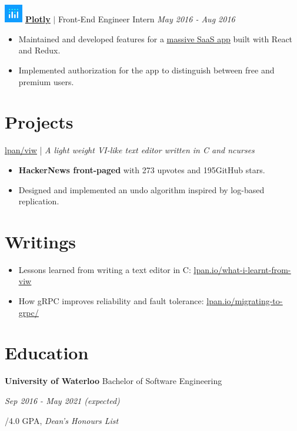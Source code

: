 \documentclass[paper=a4,fontsize=15pt]{scrartcl}
\newcommand{\quarterspace}{\vspace*{0.25em}}
\newcommand{\fullspace}{\vspace*{1em}}
\newcommand{\http}[1]{\href{http://#1}{\ul{#1}}}
\begin{document}
\fullspace
\noindent \includegraphics[width=0.8cm, height=0.8cm]{assets/plotly.png}
\normalsize
\noindent \href{https://plot.ly}{\textbf{\ul{Plotly}}}
$\vert$ \small Front-End Engineer Intern
{\hfill \footnotesize \textit{May 2016 - Aug 2016}}
\begin{itemize}[noitemsep,leftmargin=20pt,label=\raisebox{0.25ex}{\tiny$\bullet$},topsep=5pt]
  \small
  \item Maintained and developed features for a
    \href{https://plot.ly/online-chart-maker/}{\ul{massive SaaS app}} built with
    React and Redux.
  \item Implemented authorization for the app to distinguish between free and
    premium users.
\end{itemize}

\section*{Projects}{}
{
  \noindent \large
  \href{https://github.com/lpan/viw}{\ul{lpan/viw}} | \normalsize \textit{\small
    A light weight VI-like text editor written in C and ncurses}
}
\begin{itemize}[noitemsep,leftmargin=20pt,label=\raisebox{0.25ex}{\tiny$\bullet$},topsep=5pt]
  \small
  \item \textbf{HackerNews front-paged}​ with 273​ upvotes and 195​ GitHub stars.
  \item Designed and implemented an undo algorithm inspired by log-based replication​.
\end{itemize}


\section*{Writings}{}
\begin{itemize}[noitemsep,leftmargin=20pt,label=\raisebox{0.25ex}{\tiny$\bullet$},topsep=5pt]
  \small
  \item Lessons learned from writing a text editor in C: \http{lpan.io/what-i-learnt-from-viw}
  \item How gRPC improves reliability and fault tolerance: \http{lpan.io/migrating-to-grpc/}
\end{itemize}

\section*{Education}{}
\noindent \textbf{University of Waterloo} Bachelor of Software Engineering \par
\quarterspace
\footnotesize
\noindent \textit{Sep 2016 - May 2021 (expected)} \par
{}/4.0 GPA, \textit{Dean's Honours List}
\end{document}
